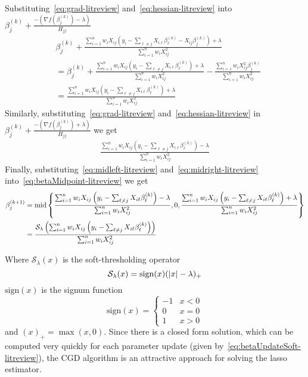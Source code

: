 Substituting~\eqref{eq:grad-litreview} and~\eqref{eq:hessian-litreview} into $\beta_j^{(k)}+ \frac{-(\nabla f(\beta_j^{(k)}) - \lambda)}{H_{jj}}$ %
\begin{align}
& \beta_j^{(k)}+ \frac{  \sum_{i=1}^{n} w_i X_{ij}\left(  y_i - \sum_{\ell \neq j}X_{i\ell} \beta_\ell^{(k)} - X_{ij}\beta_j^{(k)} \right)  + \lambda }{\sum_{i=1}^{n} w_i X_{ij}^2} \nonumber \\
& = \beta_j^{(k)}+ \frac{ \sum_{i=1}^{n} w_i X_{ij}\left(  y_i - \sum_{\ell \neq j}X_{i\ell} \beta_\ell^{(k)} \right) + \lambda}{\sum_{i=1}^{n} w_i X_{ij}^2} - \frac{\sum_{i=1}^{n} w_i X_{ij}^2\beta_j^{(k)}  }{\sum_{i=1}^{n} w_i X_{ij}^2} \nonumber \\
& =  \frac{  \sum_{i=1}^{n} w_i X_{ij}\left(  y_i - \sum_{\ell \neq j}X_{i\ell} \beta_\ell^{(k)} \right) + \lambda}{\sum_{i=1}^{n} w_i X_{ij}^2} \label{eq:midleft-litreview}
\end{align}
Similarly, substituting~\eqref{eq:grad-litreview} and~\eqref{eq:hessian-litreview} in $\beta_j^{(k)}+ \frac{-(\nabla f(\beta_j^{(k)}) + \lambda)}{H_{jj}}$ we get
\begin{align}
\frac{  \sum_{i=1}^{n} w_i X_{ij}\left(  y_i - \sum_{\ell \neq j}X_{i\ell} \beta_\ell^{(k)} \right) - \lambda}{\sum_{i=1}^{n} w_i X_{ij}^2} \label{eq:midright-litreview}
\end{align}
Finally, substituting~\eqref{eq:midleft-litreview} and~\eqref{eq:midright-litreview} into~\eqref{eq:betaMidpoint-litreview} we get
\begin{align}
\beta_j^{(k+1)} & = \textrm{{mid}}\left\lbrace \frac{  \sum_{i=1}^{n} w_i X_{ij}\left(  y_i - \sum_{\ell \neq j}X_{i\ell} \beta_\ell^{(k)} \right) - \lambda}{\sum_{i=1}^{n} w_i X_{ij}^2}, 0,\frac{  \sum_{i=1}^{n} w_i X_{ij}\left(  y_i - \sum_{\ell \neq j}X_{i\ell} \beta_\ell^{(k)} \right) + \lambda}{\sum_{i=1}^{n} w_i X_{ij}^2} \right\rbrace \nonumber \\
& = \frac{\mathcal{S}_{\lambda}\left( \sum_{i=1}^{n} w_i X_{ij}\left(  y_i - \sum_{\ell \neq j}X_{i\ell} \beta_\ell^{(k)} \right)\right) }{\sum_{i=1}^{n} w_i X_{ij}^2} \label{eq:betaUpdateSoft-litreview}
\end{align}

Where $\mathcal{S}_{\lambda}(x)$ is the soft-thresholding operator
\begin{equation*}
\mathcal{S}_{\lambda}(x) = \textrm{{sign}}(x)(|x| - \lambda)_+
\end{equation*}
$\textrm{sign}(x)$ is the signum function
\begin{equation*}
\textrm{sign}(x) = \begin{cases}
-1 & x<0\\
0 & x= 0\\
1 & x>0
\end{cases}
\end{equation*}
and $(x)_+ = \max(x, 0)$. Since there is a closed form solution, which can be computed very quickly for each parameter update (given by~\eqref{eq:betaUpdateSoft-litreview}), the CGD algorithm is an attractive approach for solving the lasso estimator.  


